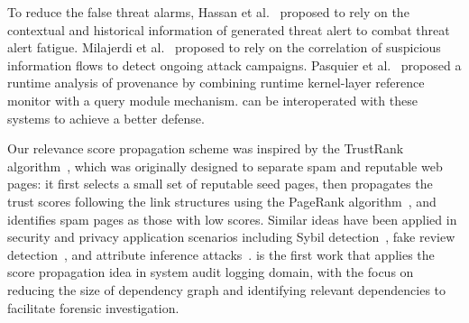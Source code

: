 To reduce the false threat alarms, Hassan et al.~\cite{hassan2019nodoze} proposed to rely on the contextual and historical information of generated threat alert to combat threat alert fatigue.
Milajerdi et al.~\cite{HOLMES} proposed to rely on the correlation of suspicious information flows to detect ongoing attack campaigns.
Pasquier et al.~\cite{pasquier2018runtime} proposed a runtime analysis of provenance by combining runtime kernel-layer reference monitor with a query module mechanism. 
\tool can be interoperated with these 
systems to achieve a better defense.







Our relevance score propagation scheme was inspired by the TrustRank algorithm~\cite{Gyongyi:2004:vldb}, which was originally designed to separate spam and reputable web pages: it first selects a small set of reputable seed pages, then propagates the trust scores following the link structures using the PageRank algorithm~\cite{Page:techreport:1998}, and identifies spam pages as those with low scores. Similar ideas have been applied in security and privacy application scenarios
including Sybil detection~\cite{cao2012sybilrank,Gong:2014:tifs,gao2018sybilfuse}, fake review detection~\cite{Rayana:2015:COS:2783258.2783370}, and attribute inference attacks~\cite{jia2017attriinfer}.
%
\tool is the first work that applies the score propagation idea in system audit logging domain, with the focus on reducing the size of dependency graph and identifying relevant dependencies to facilitate forensic investigation.


